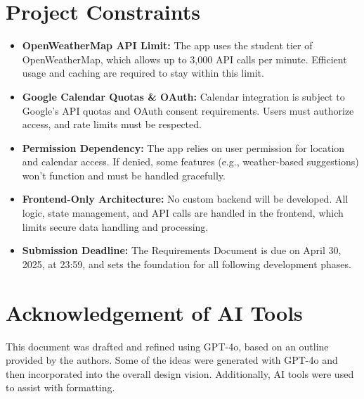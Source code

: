 \documentclass[fontsize=13pt,a4paper]{scrartcl}
\begin{document}
\section{Project Constraints}
\begin{itemize}[nosep]
  \item \textbf{OpenWeatherMap API Limit:} The app uses the student tier of OpenWeatherMap, which allows up to 3,000 API calls per minute. Efficient usage and caching are required to stay within this limit.
  \item \textbf{Google Calendar Quotas \& OAuth:} Calendar integration is subject to Google’s API quotas and OAuth consent requirements. Users must authorize access, and rate limits must be respected.
  \item \textbf{Permission Dependency:} The app relies on user permission for location and calendar access. If denied, some features (e.g., weather-based suggestions) won’t function and must be handled gracefully.
  \item \textbf{Frontend-Only Architecture:} No custom backend will be developed. All logic, state management, and API calls are handled in the frontend, which limits secure data handling and processing.
  \item \textbf{Submission Deadline:} The Requirements Document is due on April 30, 2025, at 23:59, and sets the foundation for all following development phases.
\end{itemize}

\section{Acknowledgement of AI Tools}
This document was drafted and refined using GPT-4o, based on an outline provided by the authors. Some of the ideas were generated with GPT-4o and then incorporated into the overall design vision. Additionally, AI tools were used to assist with formatting.
\end{document}
